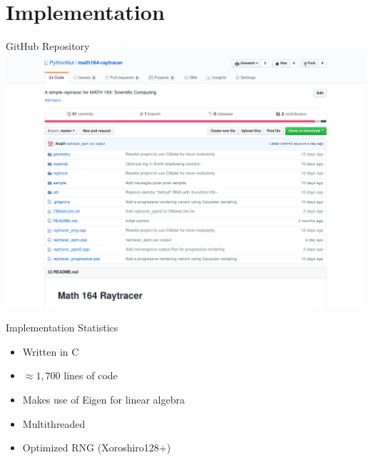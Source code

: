 \documentclass[10pt]{beamer}
\newcommand{\CC}{C\nolinebreak\hspace{-.05em}\raisebox{.4ex}{\tiny\bf +}\nolinebreak\hspace{-.10em}\raisebox{.4ex}{\tiny\bf +}}
\begin{document}
\section{Implementation}

\begin{frame}{GitHub Repository}
  \includegraphics[width=\paperwidth, center]{github.png}
\end{frame}

\begin{frame}{Implementation Statistics}
  \begin{itemize}
  \item Written in \CC
  \item \(\approx 1,700\) lines of code
  \item Makes use of Eigen for linear algebra
  \item Multithreaded
  \item Optimized RNG (Xoroshiro128+)
  \end{itemize}
\end{frame}
\end{document}
